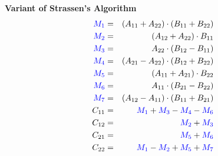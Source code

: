 \documentclass[MS]{wfuthesis}
\begin{document}
\begin{multicols}{2}
                        \textbf{Variant of Strassen's Algorithm}
                            \begin{eqnarray*}
                                \color{blue} M_1 & = & (A_{11} + A_{22})\cdot (B_{11} + B_{22}) \\
                                \color{blue} M_2 & = & (A_{12} + A_{22})\cdot B_{11} \\
                                \color{blue} M_3 & = & A_{22}\cdot (B_{12} - B_{11}) \\
                                \color{blue} M_4 & = & (A_{21} - A_{22})\cdot (B_{12} + B_{22}) \\
                                \color{blue} M_5 & = & (A_{11} + A_{21})\cdot B_{22} \\
                                \color{blue} M_6 & = & A_{11}\cdot (B_{21} - B_{22}) \\
                                \color{blue} M_7 & = & (A_{12} - A_{11})\cdot (B_{11} + B_{21}) \\
                                C_{11} & = & \color{blue} M_1 \color{black} + \color{blue} M_3 \color{black} - \color{blue} M_4 \color{black} - \color{blue} M_6 \\
                                C_{12} & = & \color{blue} M_2 \color{black} + \color{blue} M_3 \\
                                C_{21} & = & \color{blue} M_5 \color{black} + \color{blue} M_6 \\
                                C_{22} & = & \color{blue} M_1 \color{black} - \color{blue} M_2 \color{black} + \color{blue} M_5 \color{black} + \color{blue} M_7
                            \end{eqnarray*}
                    \end{multicols}
\end{document}

